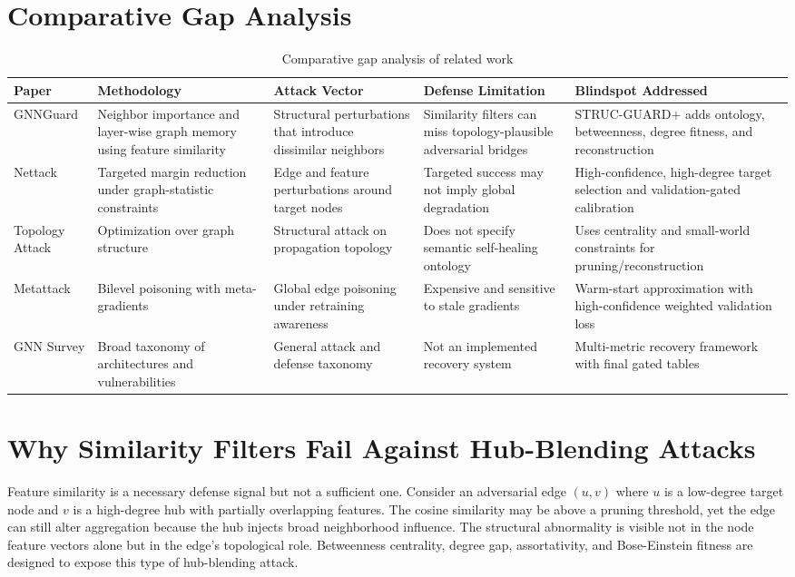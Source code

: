 \documentclass[12pt,oneside]{report}
\begin{document}
\section{Comparative Gap Analysis}
\begin{longtable}{p{1.0in}p{1.4in}p{1.35in}p{1.45in}p{1.35in}}
\caption{Comparative gap analysis of related work}\\
\toprule
\textbf{Paper} & \textbf{Methodology} & \textbf{Attack Vector} & \textbf{Defense Limitation} & \textbf{Blindspot Addressed}\\
\midrule
GNNGuard \cite{zhang2020gnnguard} & Neighbor importance and layer-wise graph memory using feature similarity & Structural perturbations that introduce dissimilar neighbors & Similarity filters can miss topology-plausible adversarial bridges & STRUC-GUARD+ adds ontology, betweenness, degree fitness, and reconstruction\\
Nettack \cite{zugner2018nettack} & Targeted margin reduction under graph-statistic constraints & Edge and feature perturbations around target nodes & Targeted success may not imply global degradation & High-confidence, high-degree target selection and validation-gated calibration\\
Topology Attack \cite{xu2019topology} & Optimization over graph structure & Structural attack on propagation topology & Does not specify semantic self-healing ontology & Uses centrality and small-world constraints for pruning/reconstruction\\
Metattack \cite{zugner2019metattack} & Bilevel poisoning with meta-gradients & Global edge poisoning under retraining awareness & Expensive and sensitive to stale gradients & Warm-start approximation with high-confidence weighted validation loss\\
GNN Survey \cite{wu2023survey} & Broad taxonomy of architectures and vulnerabilities & General attack and defense taxonomy & Not an implemented recovery system & Multi-metric recovery framework with final gated tables\\
\bottomrule
\end{longtable}

\section{Why Similarity Filters Fail Against Hub-Blending Attacks}
Feature similarity is a necessary defense signal but not a sufficient one. Consider an adversarial edge $(u,v)$ where $u$ is a low-degree target node and $v$ is a high-degree hub with partially overlapping features. The cosine similarity may be above a pruning threshold, yet the edge can still alter aggregation because the hub injects broad neighborhood influence. The structural abnormality is visible not in the node feature vectors alone but in the edge's topological role. Betweenness centrality, degree gap, assortativity, and Bose-Einstein fitness are designed to expose this type of hub-blending attack.
\end{document}
